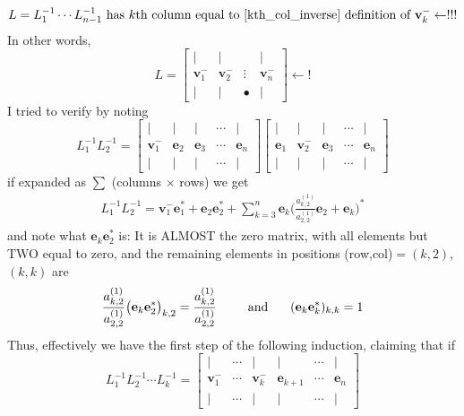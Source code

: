 \documentclass[12pt]{article}
\theoremstyle{definition}
\begin{document}
\begin{equation}
L=L_1^{-1}\cdots L_{n-1}^{-1}\text{ has }k\text{th column equal to \eqref{kth_col_inverse} definition of } \mathbf{v}^{-}_{k}  \leftarrow!!!
\end{equation}
In other words,
\begin{equation}\label{wujun_algo_great_observation}
L=
\begin{bmatrix}
| & | &  & | \\ 
\mathbf{v}_1^- & \mathbf{v}_2^- & \vdots & \mathbf{v}_n^- \\ 
| & | & • & |
\end{bmatrix}  \leftarrow!
\end{equation}
 I tried to verify by noting 
 \begin{equation}
 L_{1}^{-1}L_2^{-1}=\begin{bmatrix}
| & | & | &  \cdots & | \\ 
\mathbf{v}_1^- & \mathbf{e}_2 &\mathbf{e}_3 & \cdots & \mathbf{e}_n \\ 
| & | & | & \cdots & |
\end{bmatrix}
\begin{bmatrix}
| & | & |  & \cdots & | \\ 
\mathbf{e}_1  & \mathbf{v}_2^{-} & \mathbf{e}_3  &\cdots & \mathbf{e}_n \\ 
| & | & | & \cdots &|
\end{bmatrix}
 \end{equation}
 if expanded as $\sum$ (columns $\times$ rows) we get
 \begin{align*}
  L_{1}^{-1}L_2^{-1}=  \mathbf{v}_1^- \mathbf{e}_1^* + \mathbf{e}_2\mathbf{e}_2^*+\sum_{k=3}^n   \mathbf{e}_k \Big(\frac{a^{(1)}_{k,2}}{a^{(1)}_{2,2}}\mathbf{e}_2+\mathbf{e}_{k}\Big)^*
 \end{align*}
and note what $\mathbf{e}_k  \mathbf{e}_2^*$ is: It is ALMOST the zero matrix, with all elements but TWO equal to zero, and the remaining elements in positions (row,col)$=(k,2)$, $(k,k)$ are
\begin{equation}
\frac{a^{(1)}_{k,2}}{a^{(1)}_{2,2}}\big( \mathbf{e}_k  \mathbf{e}_2^*\big)_{k,2}=\frac{a^{(1)}_{k,2}}{a^{(1)}_{2,2}}\hspace{0.3in}\text{ and }\hspace{0.2in} (\mathbf{e}_k  \mathbf{e}_k^*)_{k,k}=1
\end{equation}
 Thus, effectively we have the first step of the following induction, claiming that if 
 \begin{equation}
 L_1^{-1}L_2^{-1}\cdots L_{k}^{-1}=
 \begin{bmatrix}
| & \cdots & | & | & \cdots & | \\ 
\mathbf{v}_1^- & \cdots & \mathbf{v}_k^{-} & \mathbf{e}_{k+1} & \cdots & \mathbf{e}_n \\ 
| & \cdots & | & | & \cdots & |
\end{bmatrix}
 \end{equation}
\end{document}
